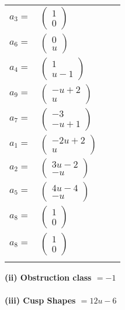 \documentclass[1p]{elsarticle_modified}
\theoremstyle{definition}
\begin{document}
\begin{tabular}{m{7pt} m{180pt} m{7pt} m{180pt} }
\flushright $a_{3}=$&$\begin{pmatrix}1\\0\end{pmatrix}$ \\
\flushright $a_{6}=$&$\begin{pmatrix}0\\u\end{pmatrix}$ \\
\flushright $a_{4}=$&$\begin{pmatrix}1\\u-1\end{pmatrix}$ \\
\flushright $a_{9}=$&$\begin{pmatrix}- u+2\\u\end{pmatrix}$ \\
\flushright $a_{7}=$&$\begin{pmatrix}-3\\- u+1\end{pmatrix}$ \\
\flushright $a_{1}=$&$\begin{pmatrix}-2 u+2\\u\end{pmatrix}$ \\
\flushright $a_{2}=$&$\begin{pmatrix}3 u-2\\- u\end{pmatrix}$ \\
\flushright $a_{5}=$&$\begin{pmatrix}4 u-4\\- u\end{pmatrix}$ \\
\flushright $a_{8}=$&$\begin{pmatrix}1\\0\end{pmatrix}$\\ \flushright $a_{8}=$&$\begin{pmatrix}1\\0\end{pmatrix}$\\&\end{tabular}
\flushleft \textbf{(ii) Obstruction class $= -1$}\\~\\
\flushleft \textbf{(iii) Cusp Shapes $= 12 u-6$}\\~\\
\end{document}
